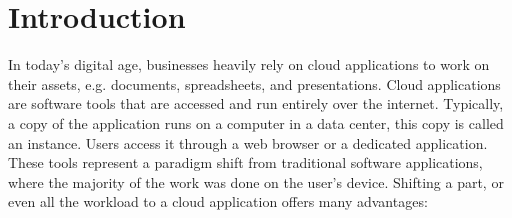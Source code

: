 \chapter{Introduction}
\label{cha:introduction}




In today's digital age, businesses heavily rely on cloud applications
to work on their assets, e.g. documents, spreadsheets, and presentations.
Cloud applications are software tools that are accessed and run entirely over the internet.
Typically, a copy of the application runs on a computer in a data center, this copy is called an instance.
Users access it through a web browser or a dedicated application.
These tools represent a paradigm shift from traditional software applications,
where the majority of the work was done on the user's device.
Shifting a part, or even all the workload to a cloud application offers many advantages:

\vspace{-1em} %

